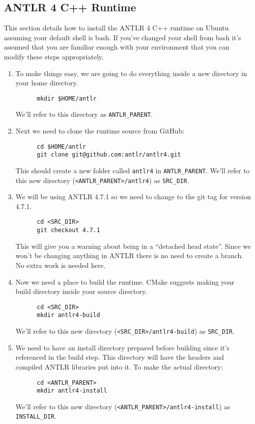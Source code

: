 \documentclass[../setup.tex]{subfiles}
\begin{document}
\subsection{ANTLR 4 C++ Runtime}
This section details how to install the ANTLR 4 C++ runtime on Ubuntu assuming your default shell
is bash. If you've changed your shell from bash it's assumed that you are familiar enough with your
environment that you can modify these steps appropriately.
\begin{enumerate}
  \item
    To make things easy, we are going to do everything inside a new directory in your home
    directory.
    \begin{lstlisting}
      mkdir $HOME/antlr
    \end{lstlisting}
    We'll refer to this directory as \lstinline{ANTLR_PARENT}.
  \item
    Next we need to clone the runtime source from GitHub:
    \begin{lstlisting}
      cd $HOME/antlr
      git clone git@github.com:antlr/antlr4.git
    \end{lstlisting}
    This should create a new folder called \lstinline{antlr4} in \lstinline{ANTLR_PARENT}. We'll
    refer to this new directory (\lstinline{<ANTLR_PARENT>/antlr4}) as \lstinline{SRC_DIR}.
  \item
    We will be using ANTLR 4.7.1 so we need to change to the git tag for version 4.7.1.
    \begin{lstlisting}
      cd <SRC_DIR>
      git checkout 4.7.1
    \end{lstlisting}
    This will give you a warning about being in a ``detached head state''. Since we won't be
    changing anything in ANTLR there is no need to create a branch. No extra work is needed here.
  \item
    Now we need a place to build the runtime. CMake suggests making your build directory inside
    your source directory.
    \begin{lstlisting}
      cd <SRC_DIR>
      mkdir antlr4-build
    \end{lstlisting}
    We'll refer to this new directory (\lstinline{<SRC_DIR>/antlr4-build}) as \lstinline{SRC_DIR}.
  \item
    We need to have an install directory prepared before building since it's referenced in the
    build step. This directory will have the headers and compiled ANTLR libraries put into it.
    To make the actual directory:
    \begin{lstlisting}
      cd <ANTLR_PARENT>
      mkdir antlr4-install
    \end{lstlisting}
    We'll refer to this new directory (\lstinline{<ANTLR_PARENT>/antlr4-install}) as
    \lstinline{INSTALL_DIR}.


\end{enumerate}
\end{document}
